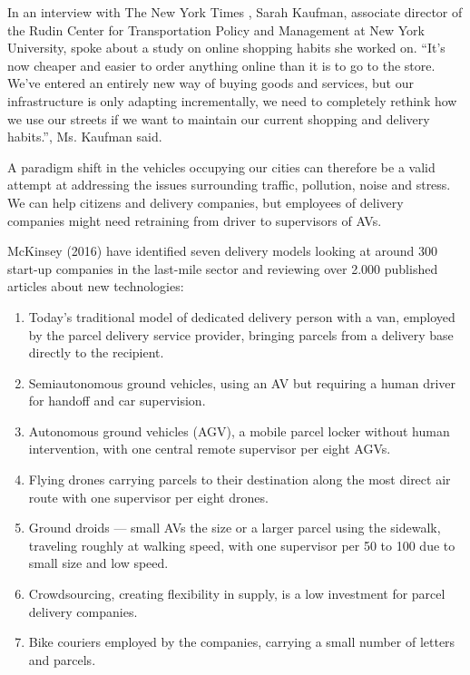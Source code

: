 \documentclass[12pt, usenames, dvipsnames]{report}
\begin{document}
\begin{flushleft}
In an interview with The New York Times \cite{haag2019}, Sarah Kaufman, associate director of the Rudin Center for Transportation Policy and Management at New York University, spoke about a study on online shopping habits she worked on.
“It’s now cheaper and easier to order anything online than it is to go to the store.
We’ve entered an entirely new way of buying goods and services, but our infrastructure is only adapting incrementally, we need to completely rethink how we use our streets if we want to maintain our current shopping and delivery habits.”, Ms. Kaufman said.

A paradigm shift in the vehicles occupying our cities can therefore be a valid attempt at addressing the issues surrounding traffic, pollution, noise and stress.
We can help citizens and delivery companies, but employees of delivery companies might need retraining from driver to supervisors of AVs.

McKinsey (2016) \cite{mckinsey2016} have identified seven delivery models looking at around 300 start-up companies in the last-mile sector and reviewing over 2.000 published articles about new technologies: 

\begin{enumerate}
	\item Today's traditional model of dedicated delivery person with a van, employed by the parcel delivery service provider, bringing parcels from a delivery base directly to the recipient.
	\item Semiautonomous ground vehicles, using an AV but requiring a human driver for handoff and car supervision.
	\item Autonomous ground vehicles (AGV), a mobile parcel locker without human intervention, with one central remote supervisor per eight AGVs.
	\item Flying drones carrying parcels to their destination along the most direct air route with one supervisor per eight drones.
	\item Ground droids --- small AVs the size or a larger parcel using the sidewalk, traveling roughly at walking speed, with one supervisor per 50 to 100 due to small size and low speed.
	\item Crowdsourcing, creating flexibility in supply, is a low investment for parcel delivery companies.
	\item Bike couriers employed by the companies, carrying a small number of letters and parcels.
\end{enumerate}


\end{flushleft}
\end{document}
